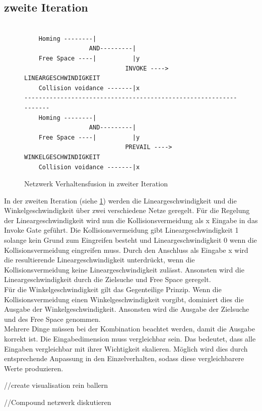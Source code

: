 \documentclass[12pt, a4paper]{report}
\begin{document}
\subsection{zweite Iteration}
\begin{figure}
    \begin{lstlisting}

    Homing --------|
                  AND---------|  
    Free Space ----|          |y
                            INVOKE ----> LINEARGESCHWINDIGKEIT   
    Collision voidance -------|x
------------------------------------------------------------------
    Homing --------|
                  AND---------|  
    Free Space ----|          |y
                            PREVAIL ----> WINKELGESCHWINDIGKEIT   
    Collision voidance -------|x
    \end{lstlisting}
    \caption{Netzwerk Verhaltensfusion in zweiter Iteration}
    \label{listing:zweitesNetzwerk}
\end{figure}
In der zweiten Iteration (siehe \ref{listing:zweitesNetzwerk}) werden die Lineargeschwindigkeit und die Winkelgeschwindigkeit über zwei verschiedene Netze geregelt. Für die Regelung der Lineargeschwindigkeit wird nun die Kollisionsvermeidung als x Eingabe in das Invoke Gate geführt. Die Kollisionsvermeidung gibt Lineargeschwindigkeit 1 solange kein Grund zum Eingreifen besteht und Lineargeschwindigkeit 0 wenn die Kollisionsvermeidung eingreifen muss. Durch den Anschluss als Eingabe x wird die resultierende Lineargeschwindigkeit unterdrückt, wenn die Kollisionsvermeidung keine Lineargeschwindigkeit zulässt. Ansonsten wird die Lineargeschwindigkeit durch die Zielsuche und Free Space geregelt.
\\
Für die Winkelgeschwindigkeit gilt das Gegenteilige Prinzip. Wenn die Kollisionsvermeidung einen Winkelgeschwindigkeit vorgibt, dominiert dies die Ausgabe der Winkelgeschwindigkeit. Ansonsten wird die Ausgabe der Zielsuche und des Free Space genommen.
\\
Mehrere Dinge müssen bei der Kombination beachtet werden, damit die Ausgabe korrekt ist. Die Eingabedimension muss vergleichbar sein. Das bedeutet, dass alle Eingaben vergleichbar mit ihrer Wichtigkeit skalieren. Möglich wird dies durch entsprechende Anpassung in den Einzelverhalten, sodass diese vergleichbarere Werte produzieren.

//create visualisation rein ballern

//Compound netzwerk diskutieren
\end{document}
